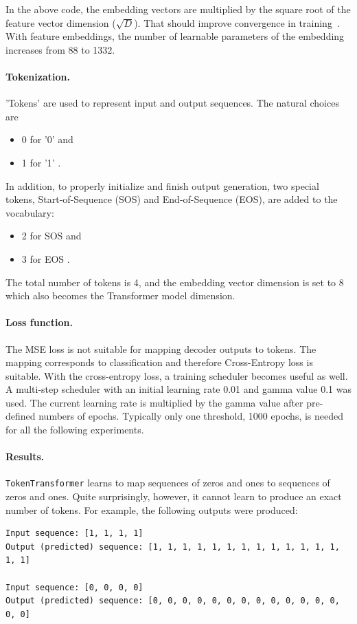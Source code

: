 \documentclass[final]{article}
\begin{document}
In the above code, the embedding vectors are multiplied by the square
root of the feature vector dimension ($\sqrt{D}$). That should improve convergence in training~\cite{transformer}. With feature embeddings, the number of learnable
parameters of the embedding increases from 88 to 1332.

\paragraph{Tokenization.}
'Tokens' are used to represent input and output sequences. The natural choices
are
\begin{itemize}
\item 0 for '0' and
\item 1 for '1' .
\end{itemize}

In addition, to properly initialize and finish output generation,
two special tokens, Start-of-Sequence (SOS) and
End-of-Sequence (EOS), are added to the vocabulary:
\begin{itemize}
\item 2 for SOS and
\item 3 for EOS .
\end{itemize}

The total number of tokens is 4, and the embedding vector
dimension is set to 8 which also becomes the Transformer model
dimension.

\paragraph{Loss function.} The MSE loss is not suitable for mapping decoder outputs to tokens. The mapping corresponds to classification and therefore Cross-Entropy loss is suitable. With the cross-entropy loss, a training scheduler becomes useful as well. A multi-step scheduler with an initial learning rate 0.01 and gamma value 0.1 was used. The current learning rate is multiplied by the gamma value after pre-defined numbers of epochs. Typically only one threshold, 1000 epochs, is needed for all the following experiments.   

\paragraph{Results.}
\texttt{TokenTransformer} learns to map sequences of zeros and ones to sequences of zeros and ones. Quite surprisingly, however, it cannot learn to produce an exact number of tokens. For example, the following outputs were produced:
\begin{verbatim}
Input sequence: [1, 1, 1, 1]
Output (predicted) sequence: [1, 1, 1, 1, 1, 1, 1, 1, 1, 1, 1, 1, 1, 1, 1]

Input sequence: [0, 0, 0, 0]
Output (predicted) sequence: [0, 0, 0, 0, 0, 0, 0, 0, 0, 0, 0, 0, 0, 0, 0]  
\end{verbatim}
\end{document}

